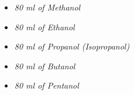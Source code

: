 \begin{itemize}
    \item \textit{80 ml of Methanol}
    \item \textit{80 ml of Ethanol}
    \item \textit{80 ml of Propanol (Isopropanol)}
    \item \textit{80 ml of Butanol}
    \item \textit{80 ml of Pentanol}
    \label{mat}
\end{itemize}



